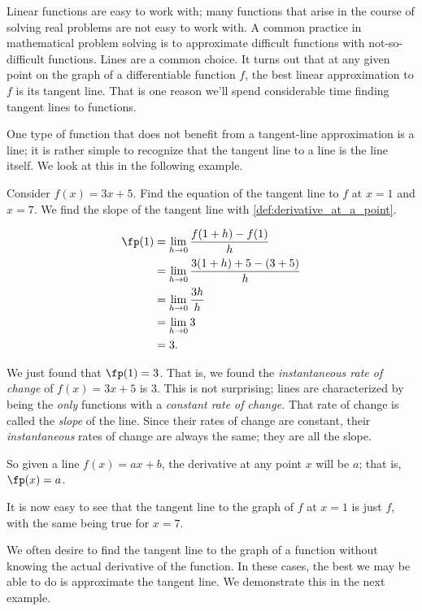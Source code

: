 Linear functions are easy to work with; many functions that arise in the course of solving real problems are not easy to work with. A common practice in mathematical problem solving is to approximate difficult functions with not-so-difficult functions. Lines are a common choice. It turns out that at any given point on the graph of a differentiable function $f$, the best linear approximation to $f$ is its tangent line. That is one reason we'll spend considerable time finding tangent lines to functions.

One type of function that does not benefit from a tangent-line approximation is a line; it is rather simple to recognize that the tangent line to a line is the line itself. We look at this in the following example.

\begin{example}\label{ex_der_line}
Consider $f(x) = 3x+5$. Find the equation of the tangent line to $f$ at $x=1$ and $x=7$.
\solution
We find the slope of the tangent line with \autoref{def:derivative_at_a_point}.

	\begin{align*}
	\fp(1) &=	\lim_{h\to 0}\frac{f(1+h)-f(1)}{h} \\
					&=	\lim_{h\to 0} \frac{3(1+h)+5 - (3+5)}{h}\\
					&=	\lim_{h\to 0} \frac{3h}{h}\\
					&=	\lim_{h\to 0} 3\\
					&= 3.
	\end{align*}
	
We just found that $\fp(1) = 3$. That is, we found the \emph{instantaneous rate of change} of $f(x) = 3x+5$ is $3$. This is not surprising; lines are characterized by being the \emph{only} functions with a \emph{constant rate of change.} That rate of change is called the \emph{slope} of the line. Since their rates of change are constant, their \emph{instantaneous} rates of  change are always the same; they are all the slope.

So given a line $f(x) = ax+b$, the derivative at any point $x$ will be $a$; that is, $\fp(x) = a$. 

It is now easy to see that the tangent line to the graph of $f$ at $x=1$ is just $f$, with the same being true for $x=7$.
\end{example}

We often desire to find the tangent line to the graph of a function without knowing the actual derivative of the function. In these cases, the best we may be able to do is approximate the tangent line. We demonstrate this in the next example.

